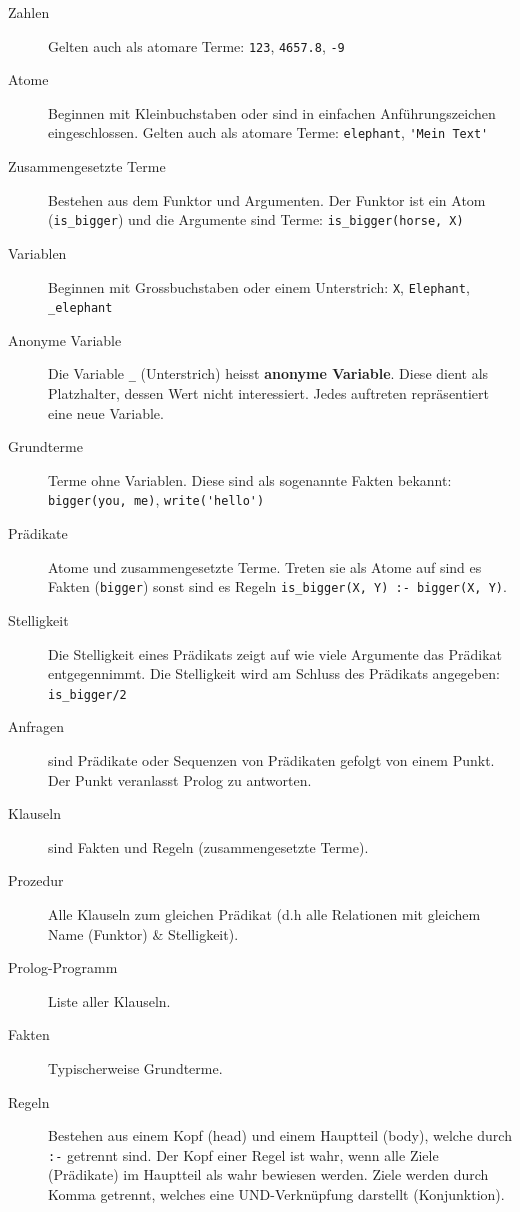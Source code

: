 \begin{description}
	\item[Zahlen] Gelten auch als atomare Terme: \verb|123|, \verb|4657.8|, \verb|-9|
	
	\item[Atome] Beginnen mit Kleinbuchstaben oder sind in einfachen Anführungszeichen eingeschlossen. Gelten auch als atomare Terme: \verb|elephant|, \verb|'Mein Text'|
	
	\item[Zusammengesetzte Terme] Bestehen aus dem Funktor und Argumenten. Der Funktor ist ein Atom (\verb|is_bigger|) und die Argumente sind Terme: \verb|is_bigger(horse, X)|
	
	\item[Variablen] Beginnen mit Grossbuchstaben oder einem Unterstrich: \verb|X|, \verb|Elephant|, \verb|_elephant|
	
	\item[Anonyme Variable] Die Variable \verb|_| (Unterstrich) heisst \textbf{anonyme Variable}. Diese dient als Platzhalter, dessen Wert nicht interessiert. Jedes auftreten repräsentiert eine neue Variable. 
		
	\item[Grundterme] Terme ohne Variablen. Diese sind als sogenannte Fakten bekannt: \verb|bigger(you, me)|, \verb|write('hello')|
	
	\item[Prädikate] Atome und zusammengesetzte Terme. Treten sie als Atome auf sind es Fakten (\verb|bigger|) sonst sind es Regeln \verb|is_bigger(X, Y) :- bigger(X, Y)|.
	
	\item[Stelligkeit] Die Stelligkeit eines Prädikats zeigt auf wie viele Argumente das Prädikat entgegennimmt. Die Stelligkeit wird am Schluss des Prädikats angegeben: \verb|is_bigger/2|
	
	\item[Anfragen] sind Prädikate oder Sequenzen von Prädikaten gefolgt von einem Punkt. Der Punkt veranlasst Prolog zu antworten.
	
	\item[Klauseln] sind Fakten und Regeln (zusammengesetzte Terme).
	
	\item[Prozedur] Alle Klauseln zum gleichen Prädikat (d.h alle Relationen mit gleichem Name (Funktor) \& Stelligkeit).
	
	\item[Prolog-Programm] Liste aller Klauseln.
	
	\item[Fakten] Typischerweise Grundterme.
	
	\item[Regeln] Bestehen aus einem Kopf (head) und einem Hauptteil (body), welche durch \verb|:-| getrennt sind. Der Kopf einer Regel ist wahr, wenn alle Ziele (Prädikate) im Hauptteil als wahr bewiesen werden. Ziele werden durch Komma getrennt, welches eine UND-Verknüpfung darstellt (Konjunktion).
\end{description}

